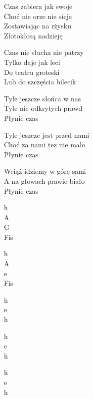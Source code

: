 \begin{text}
    Czas zabiera jak swoje\\
    Choć nie orze nie sieje\\
    Zostawiając na rżysku\\
    Złotokłosą nadzieję

    Czas nie słucha nie patrzy\\
    Tylko daje jak leci\\
    Do teatru groteski\\
    Lub do szczęścia bilecik

    Tyle jeszcze słońca w nas\\
    Tyle nie odkrytych prawd\\
    Płynie czas

    Tyle jeszcze jest przed nami\\
    Choć za nami tez nie mało\\
    Płynie czas

    Wciąż idziemy w górę sami\\
    A na głowach prawie biało\\
    Płynie czas
\end{text}
\begin{chord}
    h\\
    A\\
    G\\
    Fis

    h\\
    A\\
    e\\
    Fis

    h\\
    e\\
    h

    h\\
    e\\
    h

    h\\
    e\\
    h
\end{chord}